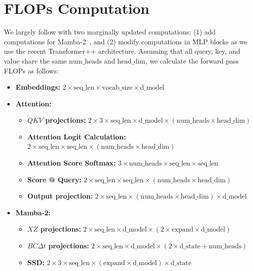 \onecolumn



\section{FLOPs Computation}
\label{sec: appendix-FLOPs_computation}
We largely follow \citet{Chinchilla} with two marginally updated computations: (1) add computations for Mamba-2~\citep{Mamba2}, and (2) modify computations in MLP blocks as we use the recent Transformer++ architecture.
Assuming that all query, key, and value share the same $\text{num\_heads}$ and $\text{head\_dim}$, we calculate the forward pass FLOPs as follows:
\begin{itemize}
    \item \textbf{Embeddings:} $2 \times \text{seq\_len} \times \text{vocab\_size} \times \text{d\_model}$
    \item \textbf{Attention:}
        \begin{itemize}
            \item \textbf{$QKV$ projections:} $2 \times 3 \times \text{seq\_len} \times \text{d\_model} \times (\text{num\_heads} \times \text{head\_dim})$
            \item \textbf{Attention Logit Calculation:} $2 \times \text{seq\_len} \times \text{seq\_len} \times (\text{num\_heads} \times \text{head\_dim})$
            \item \textbf{Attention Score Softmax:} $3 \times \text{num\_heads} \times \text{seq\_len} \times \text{seq\_len}$
            \item \textbf{Score @ Query:} $2 \times \text{seq\_len} \times \text{seq\_len} \times (\text{num\_heads} \times \text{head\_dim})$
            \item \textbf{Output projection:} $2 \times \text{seq\_len} \times (\text{num\_heads} \times \text{head\_dim}) \times \text{d\_model}$
        \end{itemize}
    \item \textbf{Mamba-2:}
        \begin{itemize}
            \item \textbf{$XZ$ projections:} $2 \times \text{seq\_len} \times \text{d\_model} \times (2 \times \text{expand} \times \text{d\_model})$
            \item \textbf{$BC \Delta t$ projections:} $2 \times \text{seq\_len} \times \text{d\_model} \times (2 \times \text{d\_state} + \text{num\_heads})$
            \item \textbf{SSD:} $2 \times 3 \times \text{seq\_len} \times (\text{expand} \times \text{d\_model}) \times \text{d\_state}$

\end{itemize}
\end{itemize}
